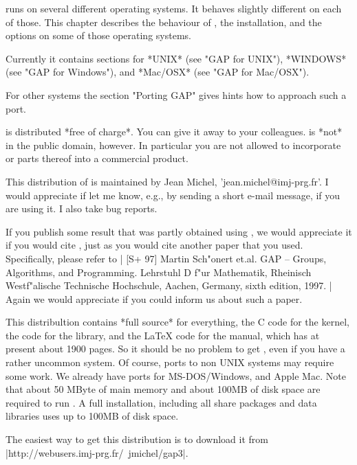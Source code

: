 {\GAP}  runs on several  different operating systems.  It behaves slightly
different  on  each  of  those.  This  chapter  describes  the behaviour of
{\GAP},  the  installation,  and  the  options  on some of those operating
systems.

Currently   it  contains  sections   for  *UNIX*  (see   "GAP  for  UNIX"),
*WINDOWS*  (see  "GAP  for  Windows"),  and  *Mac/OSX*  (see "GAP for
Mac/OSX").

For other systems the section "Porting GAP" gives hints how to
approach such a port.

%

{\GAP}  is distributed  *free of  charge*. You  can give  it away  to your
colleagues.  {\GAP} is *not* in the  public domain, however. In particular
you  are  not  allowed  to  incorporate  {\GAP}  or  parts  thereof into a
commercial product.

This distribution of {\GAP} is maintained by Jean Michel,
'jean.michel@imj-prg.fr'.  I  would  appreciate  if  let  me know, e.g., by
sending  a  short  e-mail  message,  if  you  are using it. I also take bug
reports.

If you publish some result that was partly obtained using {\GAP}, we would
appreciate  it if you  would cite {\GAP},  just as you  would cite another
paper that you used. Specifically, please refer to |
[S+ 97] Martin Sch"onert et.al.  GAP -- Groups, Algorithms, and Programming.
        Lehrstuhl D f"ur Mathematik, Rheinisch Westf"alische Technische
        Hochschule, Aachen, Germany, sixth edition, 1997.
| Again we would appreciate if you could inform us about such a paper.

This  distribultion contains *full  source* for everything,  the C code for
the  kernel, the {\GAP} code for the library, and the {\LaTeX} code for the
manual,  which has at present about 1900  pages. So it should be no problem
to  get {\GAP}, even if you have a rather uncommon system. Of course, ports
to  non  UNIX  systems  may  require  some  work. We already have ports for
MS-DOS/Windows,  and Apple Mac. Note that about 50 MByte of main memory and
about  100MB  of  disk  space  are  required  to  run {\GAP}. A full {\GAP}
installation,  including all share  packages and data  libraries uses up to
100MB of disk space.

The  easiest way  to get  this {\GAP}  distribution is  to download it from
|http://webusers.imj-prg.fr/~jmichel/gap3|.

